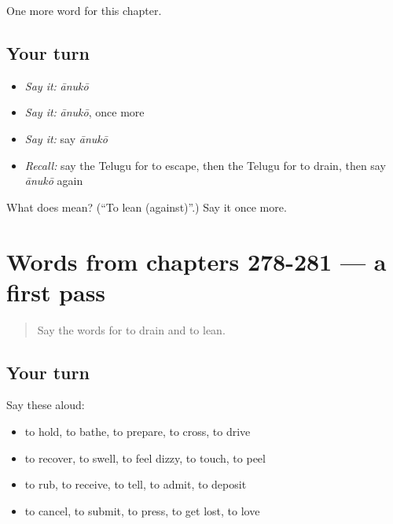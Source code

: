 \begin{grammarlens}[title={What you've built}]
One more word for this chapter.
\end{grammarlens}

\subsection*{Your turn}
\begin{itemize}
\raggedright
  \item \emph{Say it:} \emph{ānukō}
  \item \emph{Say it:} \emph{ānukō}, once more
  \item \emph{Say it:} say \emph{ānukō}
  \item \emph{Recall:} say the Telugu for to escape, then the Telugu for to drain, then say \emph{ānukō} again
\end{itemize}

\begin{tcolorbox}[breakable,colback=teal!4,colframe=teal!35!black,title={Before you move on}]
What does  mean? (\textquotedblleft{}To lean (against)\textquotedblright{}.) Say it once more.
\end{tcolorbox}
\section[(dialogue)]{Words from chapters 278-281 — a first pass}

\label{lesson:TE-R286-first-pass-words-from-chapters-278-281}



\begin{quote}
Say the words for to drain and to lean.
\end{quote}

\subsection*{Your turn}
Say these aloud:

\begin{itemize}
\raggedright
  \item to hold, to bathe, to prepare, to cross, to drive
  \item to recover, to swell, to feel dizzy, to touch, to peel
  \item to rub, to receive, to tell, to admit, to deposit
  \item to cancel, to submit, to press, to get lost, to love
\end{itemize}

